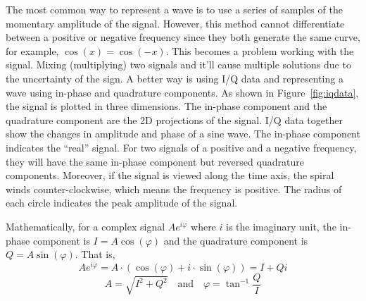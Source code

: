 The most common way to represent a wave is to use a series of samples of the momentary amplitude of the signal. However, this method cannot differentiate between a positive or negative frequency since they both generate the same curve, for example,  $\cos(x) = \cos(-x)$. This becomes a problem working with the signal. Mixing (multiplying) two signals and it'll cause multiple solutions due to the uncertainty of the sign. A better way is using I/Q data and representing a wave using in-phase and quadrature components. As shown in Figure~\ref{fig:iqdata}, the signal is plotted in three dimensions. The in-phase component and the quadrature component are the 2D projections of the signal. I/Q data together show the changes in amplitude and phase of a sine wave. The in-phase component indicates the ``real'' signal. For two signals of a positive and a negative frequency, they will have the same in-phase component but reversed quadrature components. Moreover, if the signal is viewed along the time axis, the spiral winds counter-clockwise, which means the frequency is positive. The radius of each circle indicates the peak amplitude of the signal.

Mathematically, for a complex signal $Ae^{i \varphi }$ where $i$ is the imaginary unit, the in-phase component is $I = A\cos(\varphi)$ and the quadrature component is $Q = A\sin(\varphi)$. That is,
\begin{displaymath}
	Ae^{i \varphi } = A \cdot (\cos(\varphi) + i \cdot \sin(\varphi)) = I + Qi
\end{displaymath}
\begin{displaymath}
 A = \sqrt{I^2 + Q^2}  \quad \text{and} \quad \varphi = \tan^{-1}\frac{Q}{I}
\end{displaymath}

